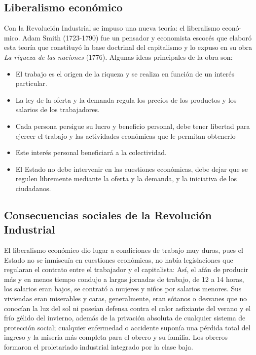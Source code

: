 \documentclass{article}
\begin{document}
  \subsection*{Liberalismo económico}

  Con la Revolución Industrial se impuso una nueva teoría: el liberalismo econó-\\mico. Adam Smith (1723-1790) fue un pensador y economista escocés que elaboró esta teoría que constituyó la base doctrinal del capitalismo y lo expuso en su obra \textit{La riqueza de las naciones} (1776). Algunas ideas principales de la obra son:

  \begin{itemize}
      \item El trabajo es el origen de la riqueza y se realiza en función de un interés particular.
      \item La ley de la oferta y la demanda regula los precios de los productos y los salarios de los trabajadores.
      \item Cada persona persigue su lucro y beneficio personal, debe tener libertad para ejercer el trabajo y las actividades económicas que le permitan obtenerlo\item Este interés personal beneficiará a la colectividad.
      \item El Estado no debe intervenir en las cuestiones económicas, debe dejar que se regulen libremente mediante la oferta y la demanda, y la iniciativa de los ciudadanos.
  
  \end{itemize}

  \subsection*{Consecuencias sociales de la Revolución Industrial}
  El liberalismo económico dio lugar a condiciones de trabajo muy duras, pues el Estado no se inmiscuía en cuestiones económicas, no había legislaciones que regularan el contrato entre el trabajador y el capitalista: Así, el afán de producir más y en menos tiempo condujo a largas jornadas de trabajo, de 12 a 14 horas, los salarios eran bajos, se contrató a mujeres y niños por salarios menores. Sus viviendas eran miserables y caras, generalmente, eran sótanos o desvanes que no conocían la luz del sol ni poseían defensa contra el calor asfixiante del verano y el frío gélido del invierno, además de la privación absoluta de cualquier sistema de protección social; cualquier enfermedad o accidente suponía una pérdida total del ingreso y la miseria más completa para el obrero y su familia. Los obreros formaron el proletariado industrial integrado por la clase baja.
\end{document}
